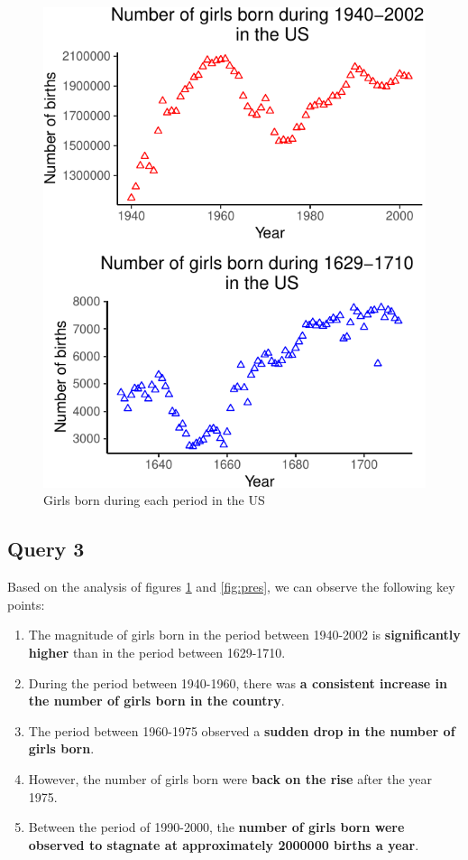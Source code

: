 \documentclass[11pt,a4paper,]{article}
\providecommand{\tightlist}{%
  \setlength{\itemsep}{0pt}\setlength{\parskip}{0pt}}
\begin{document}
\begin{figure}

{\centering \includegraphics{Arindom_Baruah_32779267_files/figure-latex/girlbirth-1} 

}

\caption{Girls born during each period in the US}\label{fig:girlbirth}
\end{figure}
\normalsize

\hypertarget{query-3}{%
\subsection{Query 3}\label{query-3}}

Based on the analysis of figures \ref{fig:girlbirth} and \ref{fig:pres}, we can observe the following key points:

\begin{enumerate}
\def\labelenumi{\arabic{enumi}.}
\tightlist
\item
  The magnitude of girls born in the period between 1940-2002 is \textbf{significantly higher} than in the period between 1629-1710.
\item
  During the period between 1940-1960, there was \textbf{a consistent increase in the number of girls born in the country}.
\item
  The period between 1960-1975 observed a \textbf{sudden drop in the number of girls born}.
\item
  However, the number of girls born were \textbf{back on the rise} after the year 1975.
\item
  Between the period of 1990-2000, the \textbf{number of girls born were observed to stagnate at approximately 2000000 births a year}.
\end{enumerate}
\end{document}
